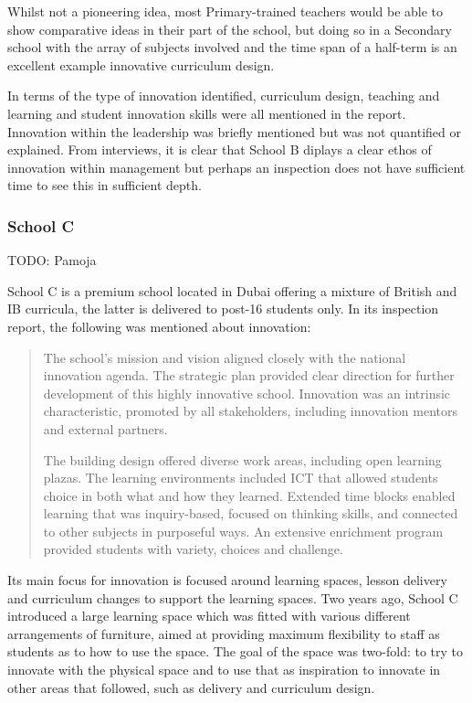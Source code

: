 Whilst not a pioneering idea, most Primary-trained teachers would be able to show comparative ideas in their part of the school, but doing so in a Secondary school with the array of subjects involved and the time span of a half-term is an excellent example innovative curriculum design.

In terms of the type of innovation identified, curriculum design, teaching and learning and student innovation skills were all mentioned in the report. Innovation within the leadership was briefly mentioned but was not quantified or explained. From interviews, it is clear that School B diplays a clear ethos of innovation within management but perhaps an inspection does not have sufficient time to see this in sufficient depth. 

\subsubsection{School C}
TODO: Pamoja

School C is a premium school located in Dubai offering a mixture of British and IB curricula, the latter is delivered to post-16 students only. In its inspection report, the following was mentioned about innovation:

\begin{quote}
The school's mission and vision aligned closely with the national innovation agenda. The strategic plan provided clear direction for further development of this highly innovative school. Innovation was an intrinsic characteristic, promoted by all stakeholders, including innovation mentors and external partners.

The building design offered diverse work areas, including open learning plazas. The learning environments included ICT that allowed students choice in both what and how they learned. Extended time blocks enabled learning that was inquiry-based, focused on thinking skills, and connected to other subjects in purposeful ways. An extensive enrichment program provided students with variety, choices and challenge.
\end{quote}

Its main focus for innovation is focused around learning spaces, lesson delivery and curriculum changes to support the learning spaces. Two years ago, School C introduced a large learning space which was fitted with various different arrangements of furniture, aimed at providing maximum flexibility to staff as students as to how to use the space. The goal of the space was two-fold: to try to innovate with the physical space and to use that as inspiration to innovate in other areas that followed, such as delivery and curriculum design. 

